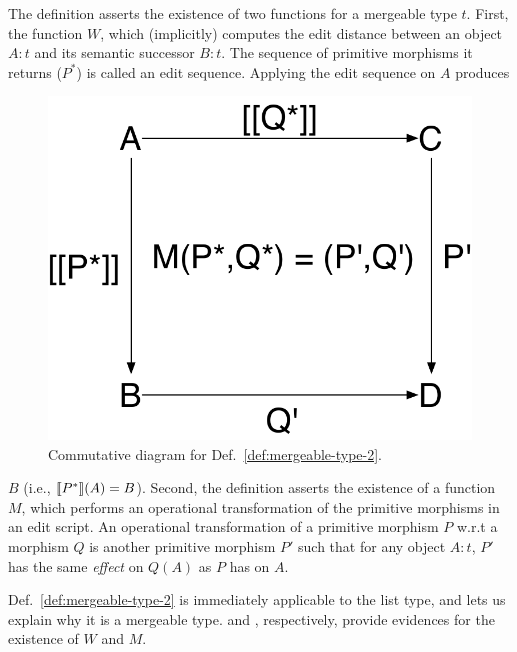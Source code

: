The definition asserts the existence of two functions for a mergeable
type $t$. First, the function $W$, which (implicitly) computes the
edit distance between an object $A:t$ and its semantic successor
$B:t$.  The sequence of primitive morphisms it returns ($P^*$) is
called an edit sequence. Applying the edit sequence on $A$ produces
\begin{figure}
\centering
\includegraphics[scale=0.35]{Figures/pushouts-2}
\caption{Commutative diagram for Def.~\ref{def:mergeable-type-2}.}
\label{fig:pushouts-2}
\end{figure}
$B$ (i.e., $\llbracket P^* \rrbracket(A) = B$). Second, the definition asserts the
existence of a function $M$, which performs an operational
transformation of the primitive morphisms in an edit script. An
operational transformation of a primitive morphism $P$ w.r.t a
morphism $Q$ is another primitive morphism $P'$ such that for any
object $A:t$, $P'$ has the same \emph{effect} on $Q(A)$ as $P$ has on
$A$.

Def.~\ref{def:mergeable-type-2} is immediately applicable to the list
type, and lets us explain why it is a mergeable type.  
and , respectively, provide evidences for the
existence of $W$ and $M$.


